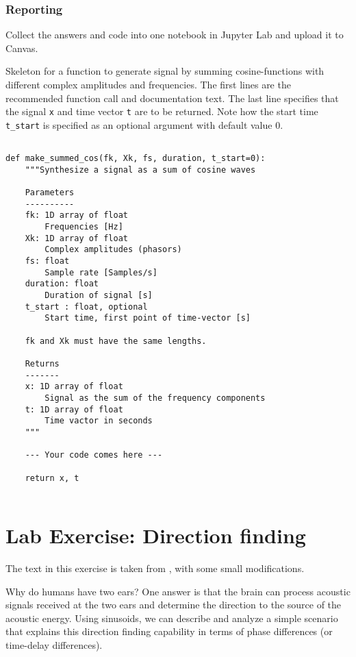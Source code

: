 \subsubsection*{Reporting}
Collect the answers and code into one notebook in Jupyter Lab and upload it to Canvas.

\begin{table}[t!]
	\caption{Skeleton for a function to generate signal by summing cosine-functions with different complex amplitudes and frequencies.		
	The first lines are the recommended function call and documentation text. The last line specifies that the signal \texttt{x} and time vector \texttt{t} are to be returned. 	
	Note how the start time \texttt{t\_start} is specified as an optional argument with default value \num{0}.
	}
	\label{tab:summed_cos}
	
\begin{lstlisting}[style=pythonstyle]

def make_summed_cos(fk, Xk, fs, duration, t_start=0):
	"""Synthesize a signal as a sum of cosine waves

	Parameters
	----------
	fk: 1D array of float
		Frequencies [Hz]
	Xk: 1D array of float
		Complex amplitudes (phasors)
	fs: float
		Sample rate [Samples/s]
	duration: float
		Duration of signal [s]
	t_start : float, optional
		Start time, first point of time-vector [s]
	
	fk and Xk must have the same lengths.

	Returns
	-------
	x: 1D array of float
		Signal as the sum of the frequency components
	t: 1D array of float
		Time vactor in seconds
	"""

	--- Your code comes here ---

	return x, t
	
\end{lstlisting}
\end{table}

\section{Lab Exercise: Direction finding}
The text in this exercise is taken from \cite{mcclellan_lab_2016}, with some small modifications.

Why do humans have two ears? One answer is that the brain can process acoustic signals received at the two ears and determine the direction to the source of the acoustic energy. Using sinusoids, we can describe and analyze a simple scenario that explains this direction finding capability in terms of phase differences (or time-delay differences). 

